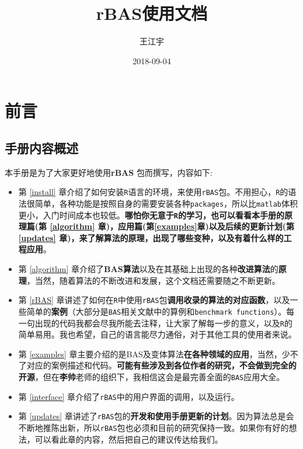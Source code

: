 \documentclass[]{ctexbook}
\title{rBAS使用文档}
\author{王江宇}
\date{2018-09-04}
\theoremstyle{definition}
\theoremstyle{definition}
\theoremstyle{definition}
\theoremstyle{remark}
\begin{document}
\maketitle

{
\setcounter{tocdepth}{2}
\tableofcontents
}
\listoftables
\listoffigures
\mainmatter

\chapter*{前言}


\section*{手册内容概述}


本手册是为了大家更好地使用\textbf{rBAS}
\citep{R-rBAS}包而撰写，内容如下:

\begin{itemize}
\item
  第 \ref{install}
  章介绍了如何安装\texttt{R}语言的环境，来使用\texttt{rBAS}包。不用担心，\texttt{R}的语法很简单，各种功能是按照自身的需要安装各种\texttt{packages}，所以比\texttt{matlab}体积更小，入门时间成本也较低。\textbf{哪怕你无意于\texttt{R}的学习，也可以看看本手册的原理篇(第
  \ref{algorithm} 章)，应用篇(第\ref{examples}章)以及后续的更新计划(第
  \ref{updates}
  章)，来了解算法的原理，出现了哪些变种，以及有着什么样的工程应用}。
\item
  第 \ref{algorithm}
  章介绍了\textbf{BAS算法}以及在其基础上出现的各种\textbf{改进算法}的\textbf{原理}，当然，随着算法的不断改进和发展，这个文档还需要随之不断更新。
\item
  第 \ref{rBAS}
  章讲述了如何在\texttt{R}中使用\texttt{rBAS}包\textbf{调用收录的算法的对应函数}，以及一些简单的\textbf{案例}（大部分是\texttt{BAS}相关文献中的算例和\texttt{benchmark\ functions}）。每一句出现的代码我都会尽我所能去注释，让大家了解每一步的意义，以及\texttt{R}的简单易用。我也希望，自己的语言能尽力通俗，对于其他工具的使用者来说。
\item
  第 \ref{examples}
  章主要介绍的是BAS及变体算法\textbf{在各种领域的应用}，当然，少不了对应的案例描述和代码。\textbf{可能有些涉及到各位作者的研究，不会做到完全的开源}，但在\textbf{李帅}老师的组织下，我相信这会是最完善全面的\texttt{BAS}应用大全。
\item
  第 \ref{interface} 章介绍了\texttt{rBAS}中的用户界面的调用，以及运行。
\item
  第 \ref{updates}
  章讲述了\texttt{rBAS}包的\textbf{开发和使用手册更新的计划}。因为算法总是会不断地推陈出新，所以\texttt{rBAS}包也必须和目前的研究保持一致。如果你有好的想法，可以看此章的内容，然后把自己的建议传达给我们。
\end{itemize}
\end{document}
